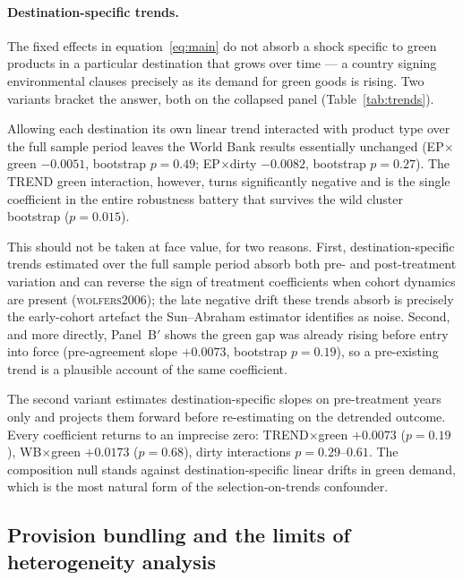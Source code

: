 \documentclass[11pt]{article}
\newcommand{\citep}[1]{(\textsc{#1})}
\begin{document}
\paragraph{Destination-specific trends.} The fixed effects in equation~\eqref{eq:main} do not
absorb a shock specific to green products in a particular destination that grows over time --- a
country signing environmental clauses precisely as its demand for green goods is rising. Two
variants bracket the answer, both on the collapsed panel (Table~\ref{tab:trends}).

Allowing each destination its own linear trend interacted with product type over the full sample
period leaves the World Bank results essentially unchanged (EP$\times$green $-0.0051$, bootstrap
$p = 0.49$; EP$\times$dirty $-0.0082$, bootstrap $p = 0.27$). The TREND green interaction, however,
turns significantly negative and is the single coefficient in the entire robustness battery that
survives the wild cluster bootstrap ($p = 0.015$).

This should not be taken at face value, for two reasons. First, destination-specific trends
estimated over the full sample period absorb both pre- and post-treatment variation and can reverse
the sign of treatment coefficients when cohort dynamics are present \citep{wolfers2006}; the late
negative drift these trends absorb is precisely the early-cohort artefact the Sun--Abraham
estimator identifies as noise. Second, and more directly, Panel~B$'$ shows the green gap was already
rising before entry into force (pre-agreement slope $+0.0073$, bootstrap $p = 0.19$), so a
pre-existing trend is a plausible account of the same coefficient.

The second variant estimates destination-specific slopes on pre-treatment years only and projects
them forward before re-estimating on the detrended outcome. Every coefficient returns to an
imprecise zero: TREND$\times$green $+0.0073$ ($p = 0.19$), WB$\times$green $+0.0173$ ($p = 0.68$),
dirty interactions $p = 0.29$--$0.61$. The composition null stands against destination-specific
linear drifts in green demand, which is the most natural form of the selection-on-trends
confounder.



\FloatBarrier
\subsection{Provision bundling and the limits of heterogeneity analysis}\label{sec:bundling}
\end{document}
